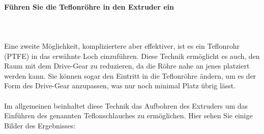 \documentclass[11pt,a4paper]{article}
\begin{document}
			\paragraph{Führen Sie die Teflonröhre in den Extruder ein}\mbox{}\\\\
Eine zweite Möglichkeit, kompliziertere aber effektiver, ist es ein Teflonrohr (PTFE) in das erwähnte Loch einzuführen. Diese Technik ermöglicht es auch, den Raum mit dem Drive-Gear zu reduzieren, da die Röhre nahe an jenes platziert werden kann. Sie können sogar den Eintritt in die Teflonröhre ändern, um es der Form des Drive-Gear anzupassen, was nur noch minimal Platz übrig lässt.
\\\\
Im allgemeinen beinhaltet diese Technik das Aufbohren des Extruders um das Einführen des genannten Teflonschlauches zu ermöglichen. Hier sehen Sie einige Bilder des Ergebnisses:
\end{document}
